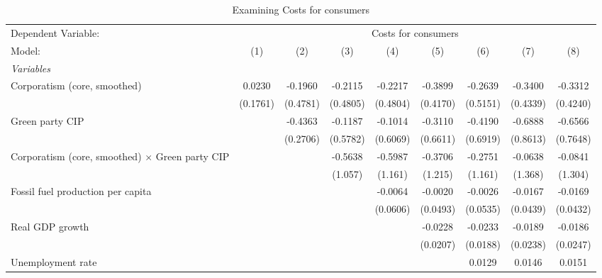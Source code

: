 
\begin{table}[htbp]
   \caption{Examining Costs for consumers}
   \centering
   \begin{tabular}{lcccccccc}
      \tabularnewline \midrule \midrule
      Dependent Variable: & \multicolumn{8}{c}{Costs for consumers}\\
      Model:                                                 & (1)      & (2)      & (3)      & (4)      & (5)      & (6)      & (7)      & (8)\\  
      \midrule
      \emph{Variables}\\
      Corporatism (core, smoothed)                           & 0.0230   & -0.1960  & -0.2115  & -0.2217  & -0.3899  & -0.2639  & -0.3400  & -0.3312\\   
                                                             & (0.1761) & (0.4781) & (0.4805) & (0.4804) & (0.4170) & (0.5151) & (0.4339) & (0.4240)\\   
      Green party CIP                                        &          & -0.4363  & -0.1187  & -0.1014  & -0.3110  & -0.4190  & -0.6888  & -0.6566\\   
                                                             &          & (0.2706) & (0.5782) & (0.6069) & (0.6611) & (0.6919) & (0.8613) & (0.7648)\\   
      Corporatism (core, smoothed) $\times$ Green party CIP  &          &          & -0.5638  & -0.5987  & -0.3706  & -0.2751  & -0.0638  & -0.0841\\   
                                                             &          &          & (1.057)  & (1.161)  & (1.215)  & (1.161)  & (1.368)  & (1.304)\\   
      Fossil fuel production per capita                      &          &          &          & -0.0064  & -0.0020  & -0.0026  & -0.0167  & -0.0169\\   
                                                             &          &          &          & (0.0606) & (0.0493) & (0.0535) & (0.0439) & (0.0432)\\   
      Real GDP growth                                        &          &          &          &          & -0.0228  & -0.0233  & -0.0189  & -0.0186\\   
                                                             &          &          &          &          & (0.0207) & (0.0188) & (0.0238) & (0.0247)\\   
      Unemployment rate                                      &          &          &          &          &          & 0.0129   & 0.0146   & 0.0151\\   

\end{tabular}
\end{table}

